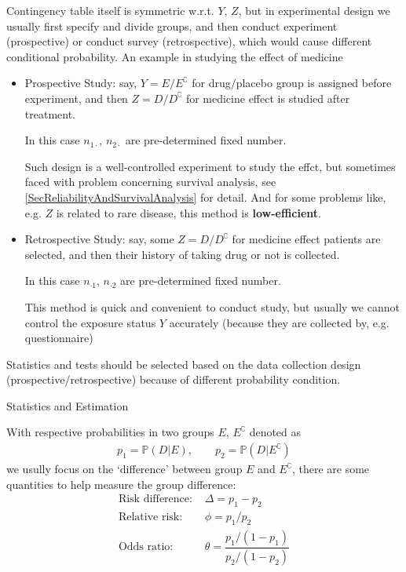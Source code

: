     Contingency table itself is symmetric w.r.t. $ Y,\,Z $, but in experimental design we usually first specify and divide groups, and then conduct experiment (prospective) or conduct survey (retrospective), which would cause different conditional probability. An example in studying the effect of medicine
    \begin{itemize}[topsep=2pt,itemsep=0pt]
        \item Prospective Study: say, $ Y=E\big/E^\complement $ for drug$ \big/ $placebo group is assigned before experiment, and then $ Z=D\big/D^\complement $ for medicine effect is studied after treatment. 
        
        In this case $ n_{1\cdot },\,n_{2\cdot } $ are pre-determined fixed number.

        Such design is a well-controlled experiment to study the effct, but sometimes faced with problem concerning survival analysis, see \autoref{SecReliabilityAndSurvivalAnalysis} for detail. And for some problems like, e.g. $ Z $ is related to rare disease, this method is \textbf{low-efficient}.

        \item Retrospective Study: say, some $ Z=D\big/D^\complement $ for medicine effect patients are selected, and then their history of taking drug or not is collected.
        
        In this case $ n_{\cdot 1},\,n_{\cdot 2} $ are pre-determined fixed number.

        This method is quick and convenient to conduct study, but usually we cannot control the exposure status $ Y $ accurately (because they are collected by, e.g. questionnaire)
    \end{itemize}

    Statistics and tests should be selected based on the data collection design (prospective/retrospective) because of different probability condition.
    
\begin{point}
    Statistics and Estimation
\end{point}


    With respective probabilities in two groups $ E,\,E^\complement $ denoted as
    \begin{align}
        p_1=\mathbb{P}\left( D|E \right),\qquad p_2=\mathbb{P}\left( D|E^\complement \right)   
    \end{align}
        we usully focus on the `difference' between group $ E $ and $ E^\complement $, there are some quantities to help measure the group difference:
\begin{align}
    \text{Risk difference: }&\Delta =p_1-p_2\\
    \text{Relative risk: }&\phi=p_1\big/p_2\\
    \text{Odds ratio: }&\theta=\dfrac{p_1/(1-p_1)}{p_2/(1-p_2)}
\end{align}

